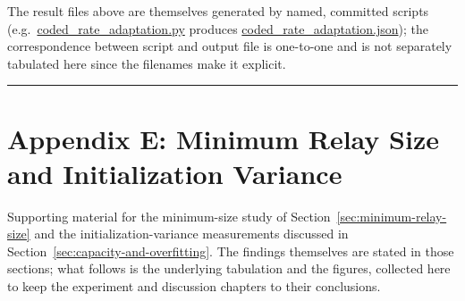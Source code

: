 The result files above are themselves generated by named, committed scripts (e.g.\ \url{coded_rate_adaptation.py} produces \url{coded_rate_adaptation.json}); the correspondence between script and output file is one-to-one and is not separately tabulated here since the filenames make it explicit.

\begin{center}\rule{0.5\linewidth}{0.5pt}\end{center}


\section{Appendix E: Minimum Relay Size and Initialization Variance}\label{sec:appendix-f-minimum-size}

Supporting material for the minimum-size study of Section~\ref{sec:minimum-relay-size} and the initialization-variance measurements discussed in Section~\ref{sec:capacity-and-overfitting}. The findings themselves are stated in those sections; what follows is the underlying tabulation and the figures, collected here to keep the experiment and discussion chapters to their conclusions.

